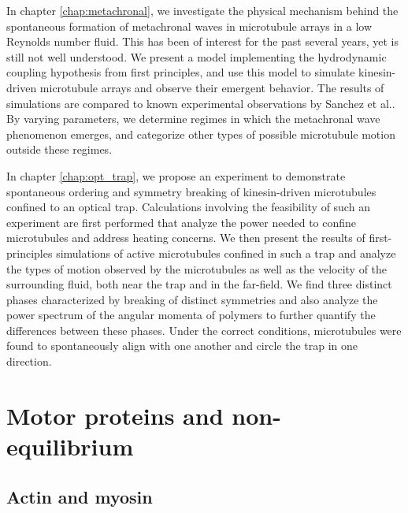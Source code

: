 \documentclass[11pt]{ucthesis}
\begin{document}
In chapter \ref{chap:metachronal}, we investigate the physical mechanism behind the spontaneous formation of metachronal
waves in microtubule arrays in a low Reynolds number fluid. This has been
of interest for the past several years, yet is still not well
understood. We present a model implementing the hydrodynamic coupling
hypothesis from first principles, and use this model to simulate
kinesin-driven microtubule arrays and observe their emergent behavior.
The results of simulations are compared to known experimental
observations by Sanchez et al.\cite{Sanchez2011,sanchez2013engineering}. By varying
parameters, we determine regimes in which the metachronal wave
phenomenon emerges, and categorize other types of possible microtubule
motion outside these regimes.

In chapter \ref{chap:opt_trap}, we propose an experiment to demonstrate spontaneous ordering and symmetry breaking of kinesin-driven microtubules confined to an optical trap. Calculations involving the feasibility of such an experiment are first performed that analyze the power needed to confine microtubules and address heating concerns. We then present the results of first-principles simulations of active microtubules confined in such a trap and analyze the types of motion observed by the microtubules as well as the velocity of the surrounding fluid, both near the trap and in the far-field. We find three distinct phases characterized by breaking of distinct symmetries and also analyze the power spectrum of the angular momenta of polymers to further quantify the differences between these phases. Under the correct conditions, microtubules were found to spontaneously align with one another and circle the trap in one direction.

\section{Motor proteins and non-equilibrium}

\subsection{Actin and myosin}
\end{document}
